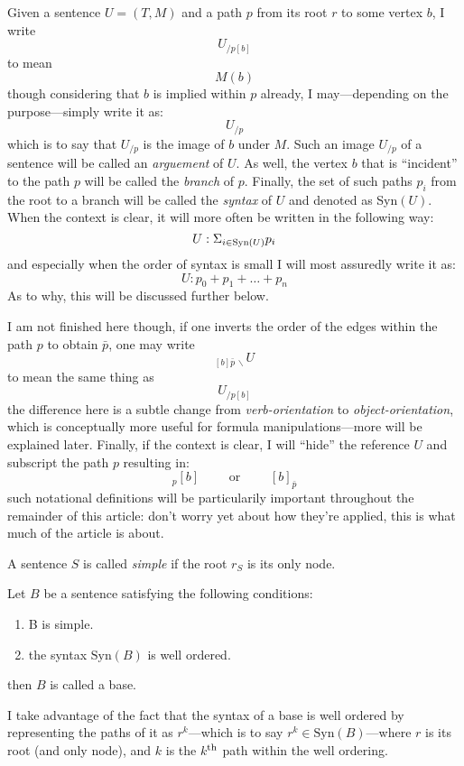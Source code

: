 \documentclass[twoside]{book}
\renewcommand{\th}{$ ^{\mbox{\scriptsize th}} $ }
\newcommand{\pass}[1][\Diamond]{\ensuremath{{_{\!/{#1}}}}}
\newenvironment{definition}[1][Definition]{\begin{trivlist}
\item[\hskip \labelsep {\bfseries Definition (#1):}]}{\end{trivlist}}
\begin{document}
Given a sentence $ U=(T, M) $ and a path $ p $ from its root $ r $ to some vertex $ b $, I write
$$ U\pass[{p[b]}] $$
to mean
$$ M(b) $$
though considering that $ b $ is implied within $ p $ already,
I may---depending on the purpose---simply write it as:
$$ U\pass[p] $$
which is to say that $ U\pass[p] $ is the image of $ b $ under $ M $.
Such an image $ U\pass[p] $ of a sentence will be called an \emph{arguement} of $ U $.
As well, the vertex $ b $ that is ``incident'' to the path $ p $ will be called the
\emph{branch} of $ p $.  Finally, the set of such paths $ p_i $ from the root to a branch
will be called the \emph{syntax} of $ U $ and denoted as Syn$ (U) $.
When the context is clear, it will more often be written in the following way:
$$ U:\Sigma_{i\in\mbox{\scriptsize Syn}(U)}p_i $$
and especially when the order of syntax is small I will most assuredly write it as:
$$ U:p_0+p_1+\ldots+p_n $$
As to why, this will be discussed further below.
 
I am not finished here though, if one inverts the order of the edges within
the path $ p $ to obtain $ \bar{p} $, one may write
$$ _{[b]\bar{p}\,\backslash}U $$
to mean the same thing as
$$ U\pass[{p[b]}] $$
the difference here is a subtle change from \emph{verb-orientation} to \emph{object-orientation},
which is conceptually more useful for formula manipulations---more will be explained later.  Finally,
if the context is clear, I will ``hide'' the reference $ U $ and subscript the path $ p $ resulting in:
$$ _p[b] \qquad\mbox{ or }\qquad [b]_{\bar{p}} $$
such notational definitions will be particularily important throughout the remainder of this article: don't worry
yet about how they're applied, this is what much of the article is about.

A sentence $ S $ is called \emph{simple} if the root $ r_S $ is its only node.

\begin{definition}[Base]

Let $ B $ be a sentence satisfying the following conditions:

\begin{enumerate}

\item B is simple.

\item the syntax $ \mbox{Syn}(B) $ is well ordered.

\end{enumerate}
then $ B $ is called a base.

\end{definition}
I take advantage of the fact that the syntax of a base is well ordered by representing
the paths of it as $ r^k $---which is to say $ r^k\in\mbox{Syn}(B) $---where $ r $ is its root (and
only node), and $ k $ is the $ k $\th path within the well ordering.
\end{document}

